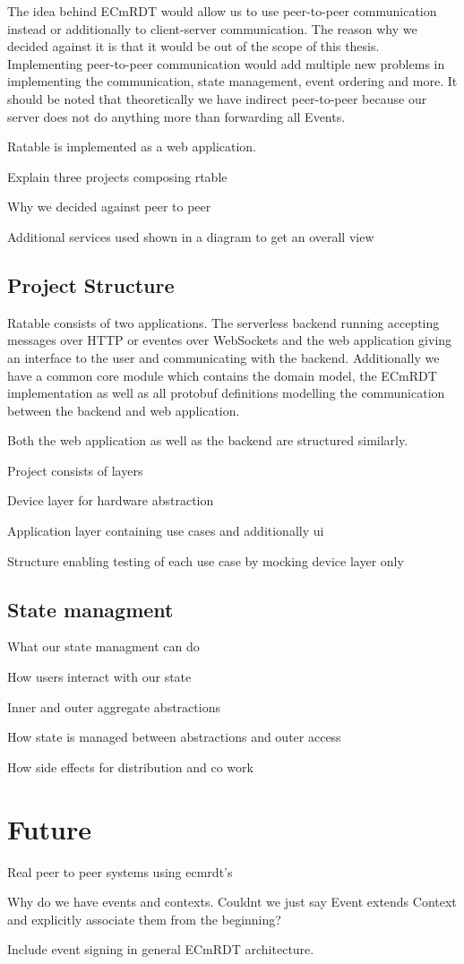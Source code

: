 \documentclass[
	ngerman,
	ruledheaders=section,   %
	class=report,		    %
	thesis={type=bachelor}, %
	accentcolor=9c,			%
	custommargins=true,    %
	marginpar=false,        %
	parskip=half-,          %
	fontsize=11pt,          %
]{tudapub}
\begin{document}
The idea behind ECmRDT would allow us to use peer-to-peer communication instead or additionally to client-server communication. The reason why we decided against it is that it would be out of the scope of this thesis. Implementing peer-to-peer communication would add multiple new problems in implementing the communication, state management, event ordering and more. It should be noted that theoretically we have indirect peer-to-peer because our server does not do anything more than forwarding all Events.

Ratable is implemented as a web application. 

Explain three projects composing rtable

Why we decided against peer to peer

Additional services used shown in a diagram to get an overall view

\section{Project Structure}
Ratable consists of two applications. The serverless backend running accepting messages over HTTP or eventes over WebSockets and the web application giving an interface to the user and communicating with the backend. Additionally we have a common core module which contains the domain model, the ECmRDT implementation as well as all protobuf definitions modelling the communication between the backend and web application.

Both the web application as well as the backend are structured similarly. 

Project consists of layers

Device layer for hardware abstraction

Application layer containing use cases and additionally ui

Structure enabling testing of each use case by mocking device layer only

\section{State managment}
What our state managment can do

How users interact with our state

Inner and outer aggregate abstractions

How state is managed between abstractions and outer access

How side effects for distribution and co work

\chapter{Future}
Real peer to peer systems using ecmrdt's

Why do we have events and contexts. Couldnt we just say Event extends Context and explicitly associate them from the beginning?

Include event signing in general ECmRDT architecture.
\end{document}
